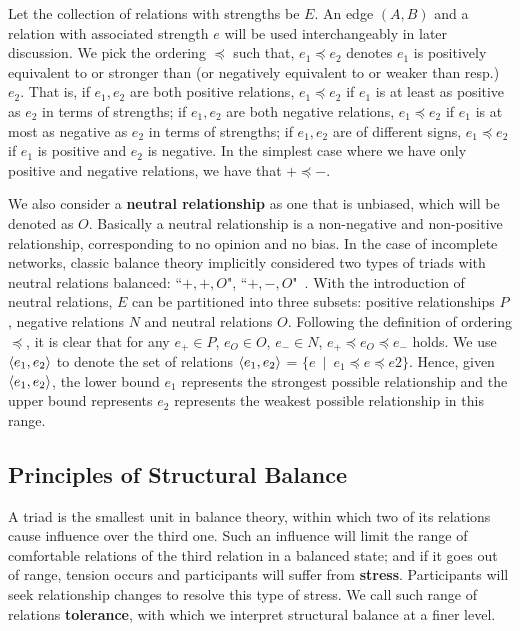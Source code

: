 Let the collection of relations with strengths be $E$. An edge $(A,B)$
and a relation with associated strength $e$ will be used
interchangeably in later discussion. We pick the ordering $\preceq$
such that, $e_{1} \preceq e_{2}$ denotes $e_{1}$ is positively
equivalent to or stronger than (or negatively equivalent to or weaker
than resp.) $e_{2}$. That is, if $e_{1}, e_{2}$ are both positive
relations, $e_{1} \preceq e_{2}$ if $e_{1}$ is at least as positive as
$e_{2}$ in terms of strengths; if $e_{1}, e_{2}$ are both negative
relations, $e_{1} \preceq e_{2}$ if $e_{1}$ is at most as negative as
$e_{2}$ in terms of strengths; if $e_{1}, e_{2}$ are of different
signs, $e_{1} \preceq e_{2}$ if $e_{1}$ is positive and $e_{2}$ is
negative. In the simplest case where we have only positive and
negative relations, we have that $+ \preceq -$. 
 
We also consider a {\bf neutral relationship} as one that is unbiased,
which will be denoted as $O$. Basically a neutral relationship is a
non-negative and non-positive relationship, corresponding to no
opinion and no bias. In the case of incomplete networks,  classic balance theory implicitly considered two types of triads with
neutral relations balanced: ``$+, +, O$",
``$+,-,O$"~\cite{kleinberg-book}. With the introduction of neutral
relations, $E$ can be partitioned into three subsets: positive
relationships $P$, negative relations $N$ and neutral relations
$O$. Following the definition of ordering $\preceq$, it is clear that
for any $e_{+} \in P$, $e_{O} \in O$, $e_{-} \in N$, $e_{+} \preceq
e_{O} \preceq e_{-}$ holds. We use $\langle e_1,e_2\rangle$ to denote the
set of relations $\langle e_1,e_2\rangle$ = $\{e\:\mid\: e_1\preceq e\preceq
e2\}$. Hence, given $\langle e_1,e_2\rangle$, the lower bound $e_1$
represents the strongest possible relationship and the upper bound
represents $e_2$ represents the weakest possible relationship in this
range.
 
\subsection{Principles of Structural Balance}
A triad is the smallest unit in balance theory, within which two of
its relations cause influence over the third one.  Such an influence
will limit the range of comfortable relations of the third relation in
a balanced state; and if it goes out of range, tension occurs and
participants will suffer from {\bf stress}. Participants will seek
relationship changes to resolve this type of stress. We call such range
of relations {\bf tolerance}, with which we interpret structural
balance at a finer level.

